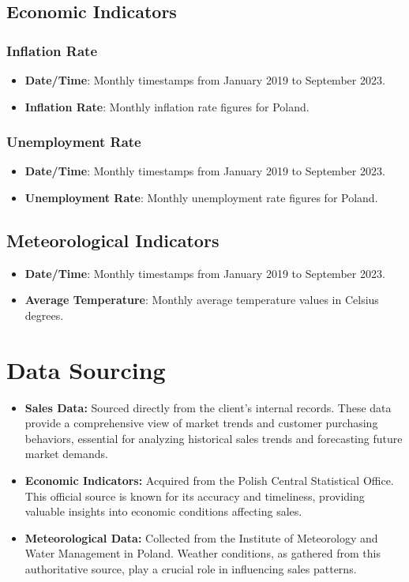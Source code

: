 \documentclass{article}
\begin{document}
\subsection{Economic Indicators}

\subsubsection{Inflation Rate}
\begin{itemize}
    \item \textbf{Date/Time}: Monthly timestamps from January 2019 to September 2023.
    \item \textbf{Inflation Rate}: Monthly inflation rate figures for Poland.
\end{itemize}

\subsubsection{Unemployment Rate}
\begin{itemize}
    \item \textbf{Date/Time}: Monthly timestamps from January 2019 to September 2023.
    \item \textbf{Unemployment Rate}: Monthly unemployment rate figures for Poland.
\end{itemize}

\subsection{Meteorological Indicators}

\begin{itemize}
    \item \textbf{Date/Time}: Monthly timestamps from January 2019 to September 2023.
    \item \textbf{Average Temperature}: Monthly average temperature values in Celsius degrees.
\end{itemize}

\section{Data Sourcing}
\begin{itemize}
\item \textbf{Sales Data:} Sourced directly from the client's internal records. These data provide a comprehensive view of market trends and customer purchasing behaviors, essential for analyzing historical sales trends and forecasting future market demands.
\item \textbf{Economic Indicators:} Acquired from the Polish Central Statistical Office. This official source is known for its accuracy and timeliness, providing valuable insights into economic conditions affecting sales.
\item \textbf{Meteorological Data:} Collected from the Institute of Meteorology and Water Management in Poland. Weather conditions, as gathered from this authoritative source, play a crucial role in influencing sales patterns.
\end{itemize}
\end{document}
